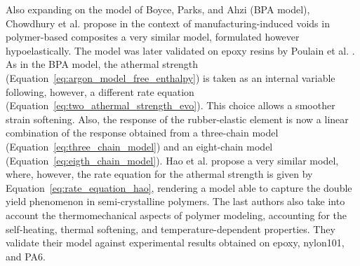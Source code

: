 Also expanding on the model of Boyce, Parks, and Ahzi \citep{boyceLargeInelasticDeformation1988} (BPA model), Chowdhury et al. \citep{chowdhuryEffectsManufacturingInducedVoids2008} propose in the context of manufacturing-induced voids in polymer-based composites a very similar model, formulated however hypoelastically.
The model was later validated on epoxy resins by Poulain et al. \citep{poulainFinitestrainElastoviscoplasticBehavior2014}.
As in the BPA model, the athermal strength (Equation~\eqref{eq:argon_model_free_enthalpy}) is taken as an internal variable following, however, a different rate equation (Equation~\eqref{eq:two_athermal_strength_evo}).
This choice allows a smoother strain softening.
Also, the response of the rubber-elastic element is now a linear combination of the response obtained from a three-chain model (Equation~\eqref{eq:three_chain_model}) and an eight-chain model (Equation~\eqref{eq:eigth_chain_model}).
Hao et al. \citep{haoUnifiedAmorphousCrystalline2022} propose a very similar model, where, however, the rate equation for the athermal strength is given by Equation~\eqref{eq:rate_equation_hao}, rendering a model able to capture the double yield phenomenon in semi-crystalline polymers.
The last authors also take into account the thermomechanical aspects of polymer modeling, accounting for the self-heating, thermal softening, and temperature-dependent properties.
They validate their model against experimental results obtained on epoxy, nylon101, and PA6.

